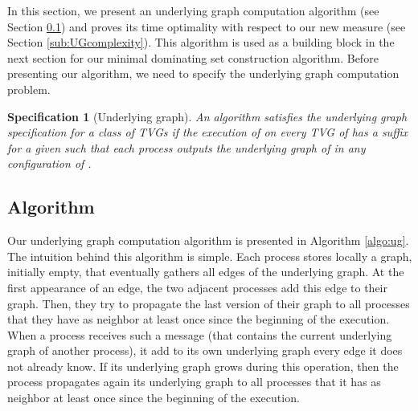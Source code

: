 \documentclass{article}
\newtheorem{specification}{Specification}
\begin{document}
In this section, we present an underlying graph computation algorithm (see Section \ref{sub:UGalgo}) and proves its time optimality with respect to our new measure (see Section \ref{sub:UGcomplexity}). This algorithm is used as a building block in the next section for our minimal dominating set construction algorithm. Before presenting our algorithm, we need to specify the underlying graph computation problem.

\begin{specification}[Underlying graph]
An algorithm  satisfies the underlying graph specification for a class of TVGs  if the execution  of  on every TVG  of  has a suffix  for a given  such that each process outputs the underlying graph of  in any configuration of .
\end{specification}

\subsection{Algorithm}\label{sub:UGalgo}

Our underlying graph computation algorithm is presented in Algorithm \ref{algo:ug}. The intuition behind this algorithm is simple. Each process stores locally a graph, initially empty, that eventually gathers all edges of the underlying graph. At the first appearance of an edge, the two adjacent processes add this edge to their graph. Then, they try to propagate the last version of their graph to all processes that they have as neighbor at least once since the beginning of the execution. When a process receives such a message (that contains the current underlying graph of another process), it add to its own underlying graph every edge it does not already know. If its underlying graph grows during this operation, then the process propagates again its underlying graph to all processes that it has as neighbor at least once since the beginning of the execution.
\end{document}
